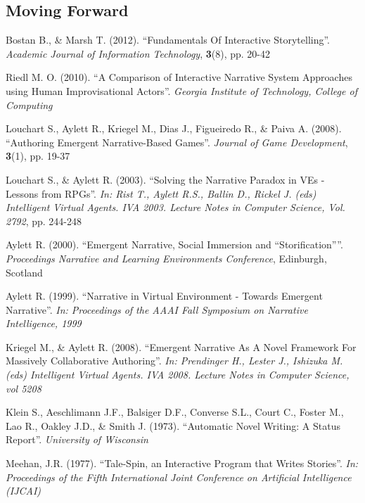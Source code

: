 \documentclass{sig-alternate-05-2015}
\begin{document}
\subsection{Moving Forward}

\newpage
{}

\begin{thebibliography}{20}

Bostan B., \& Marsh T. (2012). 
``Fundamentals Of Interactive Storytelling''. 
\textit{Academic Journal of Information Technology}, \textbf{3}(8), pp. 20-42

Riedl M. O. (2010). 
``A Comparison of Interactive Narrative System Approaches using Human Improvisational Actors''.
\textit{Georgia Institute of Technology, College of Computing}

Louchart S., Aylett R., Kriegel M., Dias J., Figueiredo R., \& Paiva A. (2008).
``Authoring Emergent Narrative-Based Games''.
\textit{Journal of Game Development}, \textbf{3}(1), pp. 19-37

Louchart S., \& Aylett R. (2003).
``Solving the Narrative Paradox in VEs - Lessons from RPGs''.
\textit{In: Rist T., Aylett R.S., Ballin D., Rickel J. (eds) Intelligent Virtual Agents. IVA 2003. Lecture Notes in Computer Science, Vol. 2792}, pp. 244-248

Aylett R. (2000).
``Emergent Narrative, Social Immersion and ``Storification''''.
\textit{Proceedings Narrative and Learning Environments Conference}, Edinburgh, Scotland

Aylett R. (1999).
``Narrative in Virtual Environment - Towards Emergent Narrative''.
\textit{In: Proceedings of the AAAI Fall Symposium on Narrative Intelligence, 1999}

Kriegel M., \& Aylett R. (2008).
``Emergent Narrative As A Novel Framework For Massively Collaborative Authoring''.
\textit{In: Prendinger H., Lester J., Ishizuka M. (eds) Intelligent Virtual Agents. IVA 2008. Lecture Notes in Computer Science, vol 5208}

Klein S., Aeschlimann J.F., Balsiger D.F., Converse S.L., Court C., Foster M., Lao R., Oakley J.D., \& Smith J. (1973).
``Automatic Novel Writing: A Status Report''.
\textit{University of Wisconsin}

Meehan, J.R. (1977).
``Tale-Spin, an Interactive Program that Writes Stories''.
\textit{In: Proceedings of the Fifth International Joint Conference on Artificial Intelligence (IJCAI)}


\end{thebibliography}
\end{document}
